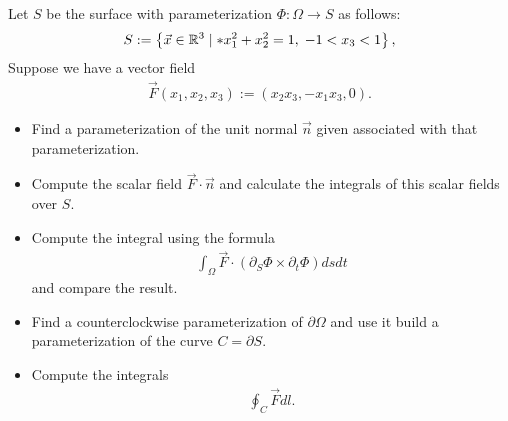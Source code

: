 \documentclass[11pt]{article}
\begin{document}
\begin{exercise} %
    Let $S$ be the surface with parameterization $\Phi : \Omega \to S$ as follows:
    \begin{align}
     S := \left\{ \vec x \in \bbR^3 \suchthat* x_1^2 + x_2^2 = 1, \; -1 < x_3 < 1 \right\},
    \end{align}
    Suppose we have a vector field 
    \begin{align}
        \vec F(x_1,x_2,x_3) := (x_2 x_3, -x_1 x_3, 0 ).
    \end{align}
    \begin{itemize}
     \item
     Find a parameterization of the unit normal $\vec n$ given associated with that parameterization.
     \item
     Compute the scalar field $\vec F \cdot \vec n$ and calculate the integrals of this scalar fields over $S$.
     \item
     Compute the integral using the formula 
     \begin{align}
        \int_\Omega \vec F \cdot ( \partial_S \Phi \times \partial_t \Phi ) dsdt
     \end{align}
     and compare the result. 
     \item 
     Find a counterclockwise parameterization of $\partial\Omega$ and use it build a parameterization of the curve $C = \partial S$.
     \item 
     Compute the integrals 
     \begin{align}
        \oint_C \vec F dl.
     \end{align}

    \end{itemize}
\end{exercise}
\end{document}
